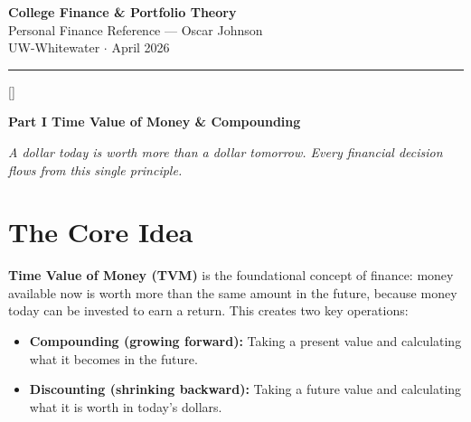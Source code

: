 \documentclass[11pt, letterpaper]{article}
\newcommand{\greensections}{%
  \titleformat{\section}{\large\bfseries\color{sectiongreen}}{}{0em}{}[\color{sectiongreen}\titlerule]%
  \titleformat{\subsection}{\normalsize\bfseries\color{sectiongreen!80!black}}{}{0em}{}%
}
\newcommand{\partbanner}[3]{%
  \begin{tcolorbox}[colback=#1, colframe=#2, boxrule=1.2pt, arc=4pt,
    left=8pt, right=8pt, top=6pt, bottom=6pt]
    \begin{center}{\LARGE\bfseries #3}\end{center}
  \end{tcolorbox}%
}
\begin{document}
\begin{center}
  {\Huge\bfseries College Finance \& Portfolio Theory}\\[6pt]
  {\large Personal Finance Reference --- Oscar Johnson}\\[4pt]
  {\normalsize UW-Whitewater \quad $\cdot$ \quad April 2026}\\[4pt]
  \rule{\textwidth}{0.8pt}
\end{center}

\vspace{8pt}
\tableofcontents
\newpage

\greensections
{}
\partbanner{part2bg}{sectiongreen}{Part I \quad Time Value of Money \& Compounding}

\vspace{6pt}
\begin{center}\small\itshape
  A dollar today is worth more than a dollar tomorrow.
  Every financial decision flows from this single principle.
\end{center}
\vspace{4pt}

\section*{The Core Idea}

\textbf{Time Value of Money (TVM)} is the foundational concept of finance: money available now is worth more than the same amount in the future, because money today can be invested to earn a return. This creates two key operations:

\begin{itemize}[noitemsep]
  \item \textbf{Compounding (growing forward):} Taking a present value and calculating what it becomes in the future.
  \item \textbf{Discounting (shrinking backward):} Taking a future value and calculating what it is worth in today's dollars.
\end{itemize}
\end{document}
